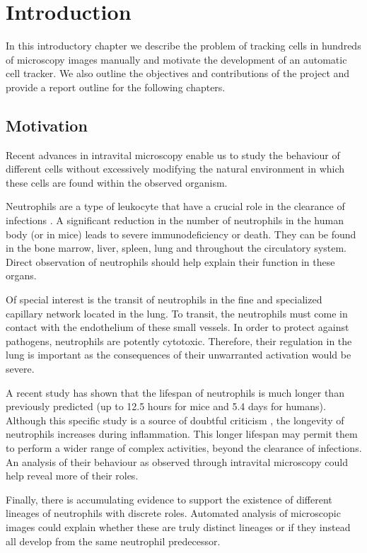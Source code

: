 	\chapter{Introduction \statusfirstdraft}


	In this introductory chapter we describe the problem of tracking cells in hundreds of microscopy images manually and motivate the development of an automatic cell tracker. We also outline the objectives and contributions of the project and provide a report outline for the following chapters.
	
	\section{Motivation \statusfirstdraft}
		
		Recent advances in intravital microscopy enable us to study the behaviour of different cells without excessively modifying the natural environment in which these cells are found within the observed organism. 
			
		Neutrophils are a type of leukocyte that have a crucial role in the clearance of infections \cite{kolku13}. A significant reduction in the number of neutrophils in the human body (or in mice) leads to severe immunodeficiency or death. They can be found in the bone marrow, liver, spleen, lung and throughout the circulatory system. Direct observation of neutrophils should help explain their function in these organs. 
		
		Of special interest is the transit of neutrophils in the fine and specialized capillary network located in the lung. To transit, the neutrophils must come in contact with the endothelium of these small vessels. In order to protect against pathogens, neutrophils are potently cytotoxic. Therefore, their regulation in the lung is important as the consequences of their unwarranted activation would be severe.
		
		A recent study \cite{pillay10} has shown that the lifespan of neutrophils is much longer than previously predicted (up to 12.5 hours for mice and 5.4 days for humans). Although this specific study is a source of doubtful criticism \cite{toft11}, the longevity of neutrophils increases during inflammation. This longer lifespan may permit them to perform a wider range of complex activities, beyond the clearance of infections. An analysis of their behaviour as observed through intravital microscopy could help reveal more of their roles.
		
		Finally, there is accumulating evidence to support the existence of different lineages of neutrophils with discrete roles. Automated analysis of microscopic images could explain whether these are truly distinct lineages or if they instead all develop from the same neutrophil predecessor.
		
